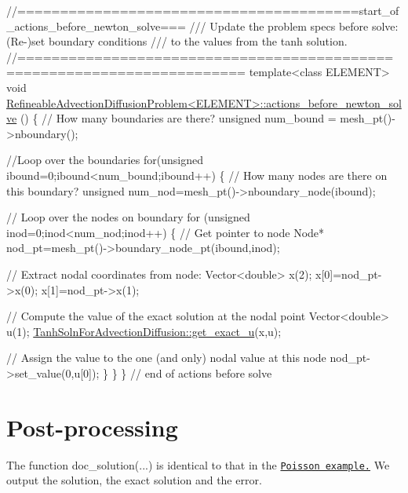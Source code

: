 \begin{DoxyCodeInclude}
\textcolor{comment}{//========================================start\_of\_actions\_before\_newton\_solve===}
\textcolor{comment}{/// Update the problem specs before solve: (Re-)set boundary conditions}
\textcolor{comment}{}\textcolor{comment}{/// to the values from the tanh solution.}
\textcolor{comment}{}\textcolor{comment}{//========================================================================}
\textcolor{keyword}{template}<\textcolor{keyword}{class} ELEMENT>
\textcolor{keywordtype}{void} \hyperlink{classRefineableAdvectionDiffusionProblem_a7cbcaa45fd7e932f335cc07a83b4d3e2}{RefineableAdvectionDiffusionProblem<ELEMENT>::actions\_before\_newton\_solve}
      ()
\{
 \textcolor{comment}{// How many boundaries are there?}
 \textcolor{keywordtype}{unsigned} num\_bound = mesh\_pt()->nboundary();
 
 \textcolor{comment}{//Loop over the boundaries}
 \textcolor{keywordflow}{for}(\textcolor{keywordtype}{unsigned} ibound=0;ibound<num\_bound;ibound++)
  \{
   \textcolor{comment}{// How many nodes are there on this boundary?}
   \textcolor{keywordtype}{unsigned} num\_nod=mesh\_pt()->nboundary\_node(ibound);

   \textcolor{comment}{// Loop over the nodes on boundary}
   \textcolor{keywordflow}{for} (\textcolor{keywordtype}{unsigned} inod=0;inod<num\_nod;inod++)
    \{
     \textcolor{comment}{// Get pointer to node}
     Node* nod\_pt=mesh\_pt()->boundary\_node\_pt(ibound,inod);

     \textcolor{comment}{// Extract nodal coordinates from node:}
     Vector<double> x(2);
     x[0]=nod\_pt->x(0);
     x[1]=nod\_pt->x(1);

     \textcolor{comment}{// Compute the value of the exact solution at the nodal point}
     Vector<double> u(1);
     \hyperlink{namespaceTanhSolnForAdvectionDiffusion_ae4c9ed0a4f123ec8e634f0cc45bfcebc}{TanhSolnForAdvectionDiffusion::get\_exact\_u}(x,u);

     \textcolor{comment}{// Assign the value to the one (and only) nodal value at this node}
     nod\_pt->set\_value(0,u[0]);
    \}
  \} 
\}  \textcolor{comment}{// end of actions before solve}

\end{DoxyCodeInclude}




 

\hypertarget{index_doc}{}\section{Post-\/processing}\label{index_doc}
The function {\ttfamily doc\+\_\+solution}(...) is identical to that in the \href{../../../poisson/two_d_poisson/html/index.html#doc}{\tt Poisson example.} We output the solution, the exact solution and the error.


